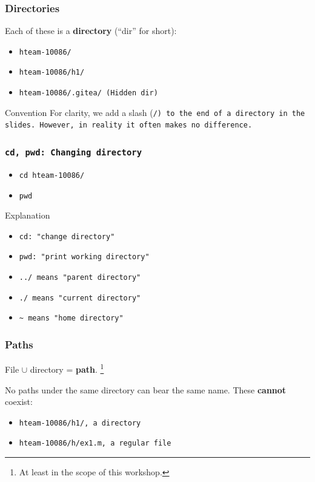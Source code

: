 \documentclass[aspectratio=169]{beamer}
\begin{document}
\begin{frame}
  \frametitle{Directories}
  Each of these is a \textbf{directory} (``dir'' for short):
  \begin{itemize}
    \item \tt{hteam-10086/}
    \item \tt{hteam-10086/h1/}
    \item \tt{hteam-10086/.gitea/} (Hidden dir)
  \end{itemize}

  \begin{block}{Convention}
    For clarity, we add a slash (\tt{/}) to the end of a directory in the
    slides. However, in reality it often makes no difference.
  \end{block}
\end{frame}

\begin{frame}
  \frametitle{\tt{cd, pwd}: Changing directory}
  \begin{itemize}
    \item \tt{cd hteam-10086/}
    \item \tt{pwd}
  \end{itemize}
  \begin{block}{Explanation}
    \begin{itemize}
      \item \tt{cd}: "change directory"
      \item \tt{pwd}: "print working directory"
      \item \tt{../} means "parent directory"
      \item \tt{./} means "current directory"
      \item \tt{\~{}} means "home directory"
    \end{itemize}
  \end{block}
\end{frame}

\begin{frame}
  \frametitle{Paths}
  File $\cup$ directory = \textbf{path}.
  \footnote{At least in the scope of this workshop.}
  \newline \newline

  No paths under the same directory can bear the same name.
  These \textbf{cannot} coexist:
  \begin{itemize}
    \item \tt{hteam-10086/h1/}, a directory
    \item \tt{hteam-10086/h/ex1.m}, a regular file
  \end{itemize}
\end{frame}
\end{document}
